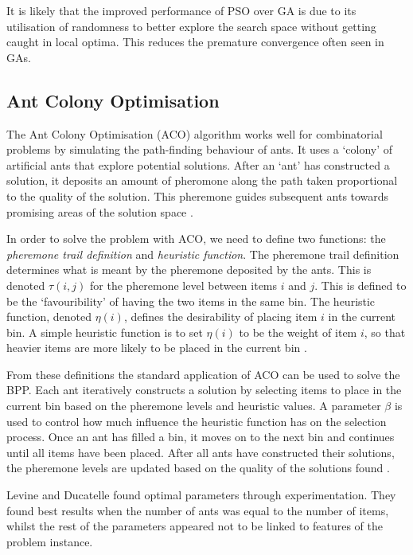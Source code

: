 \documentclass[conference]{IEEEtran}
\begin{document}
It is likely that the improved performance of PSO over GA is due to its utilisation of randomness to better explore the search space without getting caught in local optima. This reduces the premature convergence often seen in GAs.

\subsection{Ant Colony Optimisation}
The Ant Colony Optimisation (ACO) algorithm works well for combinatorial problems by simulating the path-finding behaviour of ants. It uses a `colony' of artificial ants that explore potential solutions. After an `ant' has constructed a solution, it deposits an amount of pheromone along the path taken proportional to the quality of the solution. This pheremone guides subsequent ants towards promising areas of the solution space \cite{dorigo1996ant}.

In order to solve the problem with ACO, we need to define two functions: the \textit{pheremone trail definition} and \textit{heuristic function}. The pheremone trail definition determines what is meant by the pheremone deposited by the ants. This is denoted \(\tau(i, j)\) for the pheremone level between items \(i\) and \(j\). This is defined to be the `favouribility' of having the two items in the same bin. The heuristic function, denoted \(\eta(i)\), defines the desirability of placing item \(i\) in the current bin. A simple heuristic function is to set \(\eta(i)\) to be the weight of item \(i\), so that heavier items are more likely to be placed in the current bin \cite{levine2004ant}.

From these definitions the standard application of ACO can be used to solve the BPP. Each ant iteratively constructs a solution by selecting items to place in the current bin based on the pheremone levels and heuristic values. A parameter \(\beta\) is used to control how much influence the heuristic function has on the selection process. Once an ant has filled a bin, it moves on to the next bin and continues until all items have been placed. After all ants have constructed their solutions, the pheremone levels are updated based on the quality of the solutions found \cite{levine2004ant}.

Levine and Ducatelle \cite{levine2004ant} found optimal parameters through experimentation. They found best results when the number of ants was equal to the number of items, whilst the rest of the parameters appeared not to be linked to features of the problem instance.
\end{document}
